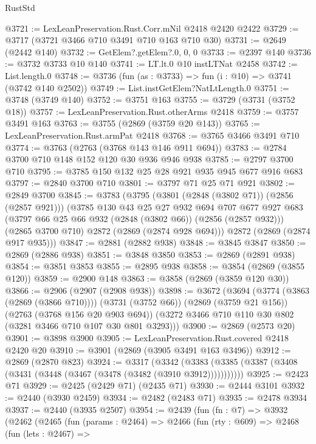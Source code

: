 \begin{lexlean}{RustStd}
\begin{coremodule}
{\begin{coremodule}
{{{{{{{{{{{{@3721 := LexLeanPreservation.Rust.Corr.mNil @2418 @2420 @2422
@3729 := @3717 (@3721 @3466 @710 @3491 @710 @163 @710 @30)
@3731 := @2649 (@2442 @140)
@3732 := GetElem?.getElem?.{0, 0, 0}
@3733 := @2397 @140
@3736 := @3732 @3733 @10 @140
@3741 := LT.lt.{0} @10 instLTNat @2458
@3742 := List.length.{0}
@3748 := @3736 (fun (as : @3733) => fun (i : @10) => @3741 (@3742 @140 @2502))
@3749 := List.instGetElem?NatLtLength.{0}
@3751 := @3748 (@3749 @140)
@3752 := @3751 @163
@3755 := @3729 (@3731 (@3752 @18))
@3757 := LexLeanPreservation.Rust.otherArms @2418
@3759 := @3757 @3491 @163
@3763 := @3755 (@2869 (@3759 @20 @143))
@3765 := LexLeanPreservation.Rust.armPat @2418
@3768 := @3765 @3466 @3491 @710
@3774 := @3763 (@2763 (@3768 @143 @146 @911 @694))
@3783 := @2784 @3700 @710 @148 @152 @120 @30 @936 @946 @938
@3785 := @2797 @3700 @710
@3795 := @3785 @150 @132 @25 @28 @921 @935 @945 @677 @916 @683
@3797 := @2840 @3700 @710
@3801 := @3797 @71 @25 @71 @921
@3802 := @2849 @3700
@3845 := @3783
    (@3795
      (@3801 (@2848 (@3802 @71)) (@2856 (@2857 @921)))
      (@3785
        @130
        @43
        @25
        @27
        @932
        @694
        @707
        @677
        @927
        @683
        (@3797 @66 @25 @66 @932 (@2848 (@3802 @66)) (@2856 (@2857 @932)))
        (@2865 @3700 @710)
        @2872
        (@2869 (@2874 @928 @694)))
      @2872
      (@2869 (@2874 @917 @935)))
@3847 := @2881 (@2882 @938)
@3848 := @3845 @3847
@3850 := @2869 (@2886 @938)
@3851 := @3848 @3850
@3853 := @2869 (@2891 @938)
@3854 := @3851 @3853
@3855 := @2895 @938
@3858 := @3854 (@2869 (@3855 @120))
@3859 := @2900 @148
@3863 := @3858 (@2869 (@3859 @120 @30))
@3866 := @2906 (@2907 (@2908 @938))
@3898 := @3672
    (@3694
      (@3774 (@3863 (@2869 (@3866 @710))))
      (@3731 (@3752 @66))
      (@2869 (@3759 @21 @156))
      (@2763 (@3768 @156 @20 @903 @694))
      (@3272 @3466 @710 @110 @30 @802 (@3281 @3466 @710 @107 @30 @801 @3293)))
@3900 := @2869 (@2573 @20)
@3901 := @3898 @3900
@3905 := LexLeanPreservation.Rust.covered @2418 @2420 @20
@3910 := @3901 (@2869 (@3905 @3491 @163 @3496))
@3912 := @2869 (@2870 @823)
@3924 := @3317
    (@3342 (@3383 (@3385 (@3387 (@3408 (@3431 (@3448 (@3467 (@3478 (@3482 (@3910 @3912)))))))))))
@3925 := @2423 @71
@3929 := @2425 (@2429 @71) (@2435 @71)
@3930 := @2444 @3101
@3932 := @2440 (@3930 @2459)
@3934 := @2482 (@2483 @71)
@3935 := @2478 @3934
@3937 := @2440 (@3935 @2507)
@3954 := @2439
    (fun (fn : @7) =>
    @3932
      (@2462
        (@2465
          (fun (params : @2464) =>
          @2466
            (fun (rty : @609) =>
            @2468
              (fun (lets : @2467) =>
}}}}}}}}}}}}
\end{coremodule}}
\end{coremodule}
\end{lexlean}
